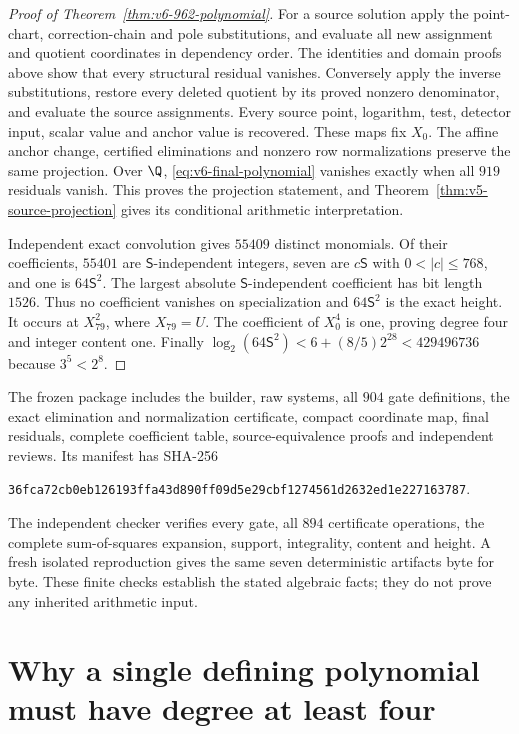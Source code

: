 \begin{proof}[Proof of Theorem~\ref{thm:v6-962-polynomial}]
For a source solution apply the point-chart, correction-chain and
pole substitutions, and evaluate all new assignment and quotient
coordinates in dependency order. The identities and domain proofs
above show that every structural residual vanishes. Conversely apply
the inverse substitutions, restore every deleted quotient by its
proved nonzero denominator, and evaluate the source assignments.
Every source point, logarithm, test, detector input, scalar value and
anchor value is recovered. These maps fix $X_0$. The affine anchor
change, certified eliminations and nonzero row normalizations preserve
the same projection. Over $\Q$, \eqref{eq:v6-final-polynomial} vanishes
exactly when all $919$ residuals vanish. This proves the projection
statement, and Theorem~\ref{thm:v5-source-projection} gives its conditional
arithmetic interpretation.

Independent exact convolution gives $55409$ distinct monomials.
Of their coefficients, $55401$ are $\mathsf S$-independent integers,
seven are $c\mathsf S$ with $0<|c|\le768$, and one is
$64\mathsf S^2$. The largest absolute $\mathsf S$-independent coefficient
has bit length $1526$. Thus no coefficient vanishes on specialization
and $64\mathsf S^2$ is the exact height. It occurs at $X_{79}^2$,
where $X_{79}=U$. The coefficient of $X_0^4$ is one, proving degree
four and integer content one. Finally
$\log_2(64\mathsf S^2)<6+(8/5)2^{28}<429496736$ because $3^5<2^8$.
\end{proof}

The frozen package includes the builder, raw systems, all $904$ gate
definitions, the exact elimination and normalization certificate,
compact coordinate map, final residuals, complete coefficient table,
source-equivalence proofs and independent reviews. Its manifest has
SHA-256
\begin{center}\small
\nolinkurl{36fca72cb0eb126193ffa43d890ff09d5e29cbf1274561d2632ed1e227163787}.
\end{center}
The independent checker verifies every gate, all $894$ certificate
operations, the complete sum-of-squares expansion, support,
integrality, content and height. A fresh isolated reproduction gives
the same seven deterministic artifacts byte for byte. These finite
checks establish the stated algebraic facts; they do not prove any
inherited arithmetic input.


\section{Why a single defining polynomial must have degree at least four}
\label{sec:degree-lower-bound}


